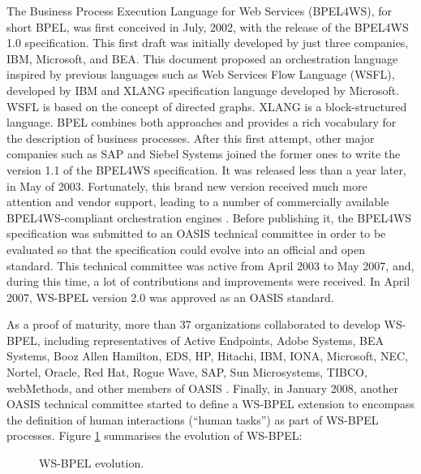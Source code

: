 The Business Process Execution Language for Web Services (BPEL4WS), for short BPEL, 
was first conceived in July, 2002, with the release of the BPEL4WS 
1.0 specification. This first draft was initially developed by just three companies, IBM, Microsoft, and BEA. 
This document proposed an orchestration language inspired 
by previous languages such as Web Services Flow Language (WSFL), developed by IBM and XLANG specification language developed
by Microsoft. WSFL is based on the concept of directed graphs.
XLANG is a block-structured language. BPEL combines
both approaches and provides a rich vocabulary for the description of business processes. 
After this first attempt, other major companies such as SAP and Siebel Systems joined the former ones to write
the version 1.1 of the BPEL4WS specification. It was released less than a year later, in May of 2003. 
Fortunately, this brand new version received much more attention and vendor support, 
leading to a number of commercially available BPEL4WS-compliant 
orchestration engines \cite{wsbpelstandard}. Before publishing it, 
the BPEL4WS specification was submitted to an OASIS 
technical committee in order to be evaluated so that the specification could evolve into an official and open standard.
This technical committee was active from April 2003 to May 2007, 
and, during this time, a lot of contributions and improvements were received. 
In April 2007, WS-BPEL version 2.0 was approved as an OASIS standard. 

As a proof of maturity, more than 37 organizations collaborated to develop WS-BPEL, including representatives of Active Endpoints, Adobe Systems, BEA Systems, Booz Allen Hamilton, EDS, HP, Hitachi, IBM, IONA, Microsoft, NEC, Nortel, Oracle, Red Hat, Rogue Wave, SAP, Sun Microsystems, TIBCO, webMethods, and other members of OASIS \cite{wsbpelstandard}.
Finally, in January 2008, another OASIS technical committee started 
to define a WS-BPEL extension to encompass the definition of 
human interactions (``human tasks'') as part of WS-BPEL processes. Figure \ref{bpelevolution} summarises the evolution of WS-BPEL:

\begin{figure}[h]
\begin{center}
\end{center}
\caption{WS-BPEL evolution.}
\label{bpelevolution}
\end{figure}


